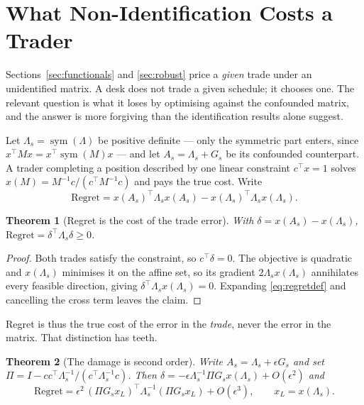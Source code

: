 \documentclass[10pt,twocolumn]{article}
\newtheorem{theorem}{Theorem}
\theoremstyle{remark}
\newcommand{\sym}{\operatorname{sym}}
\begin{document}
\section{What Non-Identification Costs a Trader}
\label{sec:regret}

Sections~\ref{sec:functionals} and \ref{sec:robust} price a \emph{given} trade
under an unidentified matrix. A desk does not trade a given schedule; it
chooses one. The relevant question is what it loses by optimising against the
confounded matrix, and the answer is more forgiving than the identification
results alone suggest.

Let $\Lambda_s=\sym(\Lambda)$ be positive definite --- only the symmetric part
enters, since $x^\top Mx=x^\top\sym(M)x$ --- and let $A_s=\Lambda_s+G_s$ be its
confounded counterpart. A trader completing a position described by one linear
constraint $c^\top x=1$ solves
$x(M)=M^{-1}c/(c^\top M^{-1}c)$ and pays the true cost. Write
\begin{equation}
\mathrm{Regret}=x(A_s)^\top\Lambda_sx(A_s)-x(\Lambda_s)^\top\Lambda_s
x(\Lambda_s).
\label{eq:regretdef}
\end{equation}

\begin{theorem}[Regret is the cost of the trade error]
\label{thm:regret}
With $\delta=x(A_s)-x(\Lambda_s)$,
$\mathrm{Regret}=\delta^\top\Lambda_s\delta\ge0$.
\end{theorem}

\begin{proof}
Both trades satisfy the constraint, so $c^\top\delta=0$. The objective is
quadratic and $x(\Lambda_s)$ minimises it on the affine set, so its gradient
$2\Lambda_sx(\Lambda_s)$ annihilates every feasible direction, giving
$\delta^\top\Lambda_sx(\Lambda_s)=0$. Expanding \eqref{eq:regretdef} and
cancelling the cross term leaves the claim.
\end{proof}

Regret is thus the true cost of the error in the \emph{trade}, never the error
in the matrix. That distinction has teeth.

\begin{theorem}[The damage is second order]
\label{thm:secondorder}
Write $A_s=\Lambda_s+\epsilon G_s$ and set
$\Pi=I-cc^\top\Lambda_s^{-1}/(c^\top\Lambda_s^{-1}c)$. Then
$\delta=-\epsilon\Lambda_s^{-1}\Pi G_sx(\Lambda_s)+O(\epsilon^2)$ and
\begin{equation}
\mathrm{Regret}=\epsilon^2\,(\Pi G_sx_L)^\top\Lambda_s^{-1}(\Pi G_sx_L)
+O(\epsilon^3),\qquad x_L=x(\Lambda_s).
\label{eq:secondorder}
\end{equation}
\end{theorem}
\end{document}
